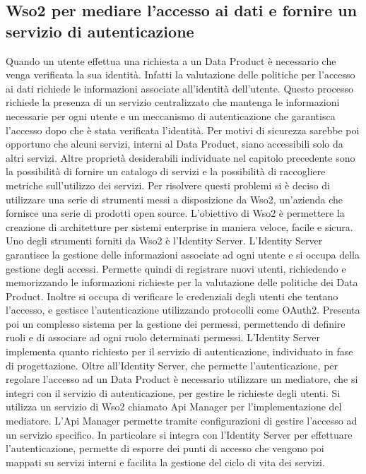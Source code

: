 \documentclass[12pt]{report}
\begin{document}
\subsection{Wso2 per mediare l'accesso ai dati e fornire un servizio di autenticazione}
Quando un utente effettua una richiesta a un  Data Product è necessario che venga verificata la sua identità.
Infatti la valutazione delle politiche per l'accesso ai dati richiede le informazioni associate all'identità dell'utente.
Questo processo richiede la presenza di un servizio centralizzato che mantenga le informazioni necessarie per ogni utente e un meccanismo di autenticazione che garantisca l'accesso dopo che è stata verificata l'identità.
Per motivi di sicurezza sarebbe poi opportuno che alcuni servizi, interni al Data Product, siano accessibili solo da altri servizi.
Altre proprietà desiderabili individuate nel capitolo precedente sono la possibilità di fornire un catalogo di servizi e la possibilità di raccogliere metriche sull'utilizzo dei servizi.
Per risolvere questi problemi si è deciso di utilizzare una serie di strumenti messi a disposizione da Wso2, un'azienda che fornisce una serie di prodotti open source. 
L'obiettivo di Wso2 è permettere la creazione di architetture per sistemi enterprise in maniera veloce, facile e sicura.
Uno degli strumenti forniti da Wso2 è l'Identity Server.
L'Identity Server garantisce la gestione delle informazioni associate ad ogni utente e si occupa della gestione degli accessi.
Permette quindi di registrare nuovi utenti, richiedendo e memorizzando le informazioni richieste per la valutazione delle politiche dei Data Product. 
Inoltre si occupa di verificare le credenziali degli utenti  che tentano l'accesso, e gestisce l'autenticazione utilizzando protocolli come OAuth2.
Presenta poi un complesso sistema per la gestione dei permessi, permettendo di definire ruoli e di associare ad ogni ruolo determinati permessi.
L'Identity Server implementa quanto richiesto per il servizio di autenticazione, individuato in fase di progettazione.
Oltre all'Identity Server, che permette l'autenticazione, per regolare l'accesso ad un Data Product è necessario utilizzare un mediatore, che si integri con il servizio di autenticazione, per gestire le richieste degli utenti.
Si utilizza un servizio di Wso2 chiamato Api Manager per l'implementazione del mediatore.
L'Api Manager permette tramite configurazioni di gestire l'accesso ad un servizio specifico.
In particolare si integra con l'Identity Server per effettuare l'autenticazione, permette di esporre dei punti di accesso che vengono poi mappati su servizi interni e facilita la gestione del ciclo di vita dei servizi.
\end{document}
